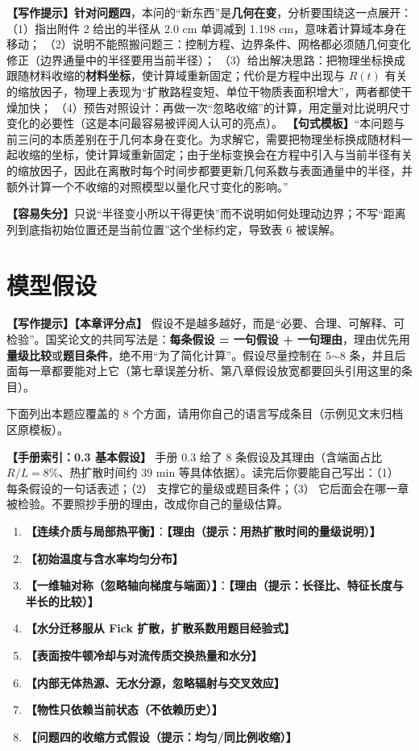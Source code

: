 \documentclass[12pt,a4paper]{article}
\newcommand{\prompt}[1]{\par\noindent\textbf{【写作提示】}#1\par}      %
\newcommand{\pitfall}[1]{\par\noindent\textbf{【容易失分】}#1\par}     %
\newcommand{\ph}[1]{\textbf{【#1】}}                                   %
\newcommand{\handbook}[2]{\par\noindent\textbf{【手册索引：#1】} #2\par}
\begin{document}
\prompt{\textbf{针对问题四}，本问的“新东西”是\textbf{几何在变}，分析要围绕这一点展开：
（1）指出附件 2 给出的半径从 2.0 cm 单调减到 1.198 cm，意味着计算域本身在移动；
（2）说明不能照搬问题三：控制方程、边界条件、网格都必须随几何变化修正（边界通量中的半径要用当前半径）；
（3）给出解决思路：把物理坐标换成跟随材料收缩的\textbf{材料坐标}，使计算域重新固定；代价是方程中出现与 $R(t)$ 有关的缩放因子，物理上表现为“扩散路程变短、单位干物质表面积增大”，两者都使干燥加快；
（4）预告对照设计：再做一次“忽略收缩”的计算，用定量对比说明尺寸变化的必要性（这是本问最容易被评阅人认可的亮点）。
\textbf{【句式模板】}“本问题与前三问的本质差别在于几何本身在变化。为求解它，需要把物理坐标换成随材料一起收缩的坐标，使计算域重新固定；由于坐标变换会在方程中引入与当前半径有关的缩放因子，因此在离散时每个时间步都要更新几何系数与表面通量中的半径，并额外计算一个不收缩的对照模型以量化尺寸变化的影响。”}

\pitfall{只说“半径变小所以干得更快”而不说明如何处理动边界；不写“距离列到底指初始位置还是当前位置”这个坐标约定，导致表 6 被误解。}

\clearpage

\section{模型假设}

\prompt{\textbf{【本章评分点】} 假设不是越多越好，而是“必要、合理、可解释、可检验”。国奖论文的共同写法是：\textbf{每条假设 = 一句假设 + 一句理由}，理由优先用\textbf{量级比较}或\textbf{题目条件}，绝不用“为了简化计算”。假设尽量控制在 5$\sim$8 条，并且后面每一章都要能对上它（第七章误差分析、第八章假设放宽都要回头引用这里的条目）。

下面列出本题应覆盖的 8 个方面，请用你自己的语言写成条目（示例见文末归档区原模板）。}

\handbook{0.3 基本假设}{手册 0.3 给了 8 条假设及其理由（含端面占比 $R/L=8\%$、热扩散时间约 $39$ min 等具体依据）。读完后你要能自己写出：（1） 每条假设的一句话表述；（2） 支撑它的量级或题目条件；（3） 它后面会在哪一章被检验。不要照抄手册的理由，改成你自己的量级估算。}

\begin{enumerate}[label=(\arabic*)]
  \item \ph{连续介质与局部热平衡}：\ph{理由（提示：用热扩散时间的量级说明）}
  \item \ph{初始温度与含水率均匀分布}
  \item \ph{一维轴对称（忽略轴向梯度与端面）}：\ph{理由（提示：长径比、特征长度与半长的比较）}
  \item \ph{水分迁移服从 Fick 扩散，扩散系数用题目经验式}
  \item \ph{表面按牛顿冷却与对流传质交换热量和水分}
  \item \ph{内部无体热源、无水分源，忽略辐射与交叉效应}
  \item \ph{物性只依赖当前状态（不依赖历史）}
  \item \ph{问题四的收缩方式假设（提示：均匀/同比例收缩）}
\end{enumerate}
\end{document}
